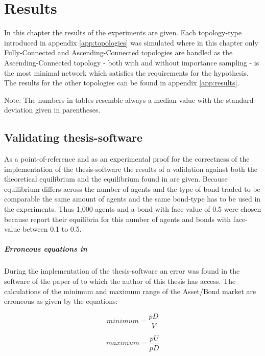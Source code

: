 \documentclass[Bachelorarbeit.tex]{subfiles}
\begin{document}
\graphicspath{{./figures/results/}}	%

\chapter{Results}
\label{ch:results}

In this chapter the results of the experiments are given. Each topology-type introduced in appendix \ref{app:topologies} was simulated where in this chapter only Fully-Connected and Ascending-Connected topologies are handled as the Ascending-Connected topology - both with and without importance sampling - is the most minimal network which satisfies the requirements for the hypothesis. The results for the other topologies can be found in appendix \ref{app:results}.

Note: The numbers in tables resemble always a median-value with the standard-deviation given in parentheses.

\section{Validating thesis-software}
As  a point-of-reference and as an experimental proof for the correctness of the implementation of the thesis-software the results of a validation against both the theoretical equilibrium and the equilibrium found in \cite{Breuer2015} are given. Because equilibrium differs across the number of agents and the type of bond traded to be comparable the same amount of agents and the same bond-type has to be used in the experiments. Thus 1,000 agents and a bond with face-value of 0.5 were chosen because \cite{Breuer2015} report their equilibria for this number of agents and bonds with face-value between 0.1 to 0.5.

\paragraph{Erroneous equations in \cite{Breuer2015}} During the implementation of the thesis-software an error was found in the software of the paper of \cite{Breuer2015} to which the author of this thesis has access. The calculations of the minimum and maximum range of the Asset/Bond market are erroneous as given by the equations:

\begin{equation}
minimum = \frac{pD}{V}
\end{equation}

\begin{equation}
maximum = \frac{pU}{pD} 
\end{equation}\\
\end{document}
